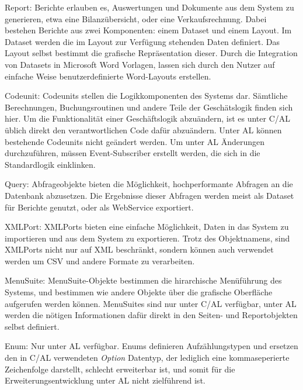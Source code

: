 Report: Berichte erlauben es, Auswertungen und Dokumente aus dem System zu generieren, etwa eine Bilanzübersicht, oder eine Verkaufsrechnung. Dabei bestehen Berichte aus zwei Komponenten: einem Dataset und einem Layout. Im Dataset werden die im Layout zur Verfügung stehenden Daten definiert. Das Layout selbst bestimmt die grafische Repräsentation dieser. Durch die Integration von Datasets in Microsoft Word Vorlagen, lassen sich durch den Nutzer auf einfache Weise benutzerdefinierte Word-Layouts erstellen.
\linebreak

Codeunit: Codeunits stellen die Logikkomponenten des Systems dar. Sämtliche Berechnungen, Buchungsroutinen und andere Teile der Geschätslogik finden sich hier. Um die Funktionalität einer Geschäftslogik abzuändern, ist es unter C/AL üblich direkt den verantwortlichen Code dafür abzuändern. Unter AL können bestehende Codeunits nicht geändert werden. Um unter AL Änderungen durchzuführen, müssen Event-Subscriber erstellt werden, die sich in die Standardlogik einklinken. 
\linebreak

Query: Abfrageobjekte bieten die Möglichkeit, hochperformante Abfragen an die Datenbank abzusetzen. Die Ergebnisse dieser Abfragen werden meist als Dataset für Berichte genutzt, oder als WebService exportiert.
\pagebreak

XMLPort: XMLPorts bieten eine einfache Möglichkeit, Daten in das System zu importieren und aus dem System zu exportieren. Trotz des Objektnamens, sind XMLPorts nicht nur auf XML beschränkt, sondern können auch verwendet werden um CSV und andere Formate zu verarbeiten.
\linebreak

MenuSuite: MenuSuite-Objekte bestimmen die hirarchische Menüführung des Systems, und bestimmen wie andere Objekte über die grafische Oberfläche aufgerufen werden können. MenuSuites sind nur unter C/AL verfügbar, unter AL werden die nötigen Informationen dafür direkt in den Seiten- und Reportobjekten selbst definiert.
\linebreak

Enum: Nur unter AL verfügbar. Enums definieren Aufzählungstypen und ersetzen den in C/AL verwendeten \textit{Option} Datentyp, der lediglich eine kommaseperierte Zeichenfolge darstellt, schlecht erweiterbar ist, und somit für die Erweiterungsentwicklung unter AL nicht zielführend ist.




























